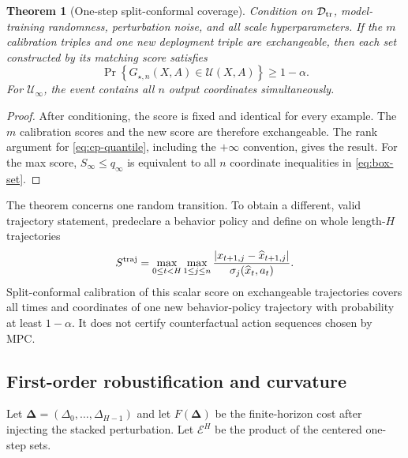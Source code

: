 \documentclass[10pt]{article}
\newtheorem{theorem}{Theorem}
\newcommand{\U}{\mathcal U}
\newcommand{\D}{\mathcal D}
\begin{document}
\begin{theorem}[One-step split-conformal coverage]
Condition on $\D_{\rm tr}$, model-training randomness, perturbation noise, and
all scale hyperparameters. If the $m$ calibration triples and one new
deployment triple are exchangeable, then each set constructed by its matching
score satisfies
\[
\Pr\left\{G_{\star,n}(X,A)\in\U(X,A)\right\}\ge1-\alpha.
\]
For $\U_\infty$, the event contains all $n$ output coordinates
simultaneously.
\end{theorem}
\begin{proof}
After conditioning, the score is fixed and identical for every example. The
$m$ calibration scores and the new score are therefore exchangeable. The rank
argument for \cref{eq:cp-quantile}, including the $+\infty$ convention, gives
the result. For the max score, $S_\infty\le q_\infty$ is equivalent to all
$n$ coordinate inequalities in \cref{eq:box-set}.
\end{proof}

The theorem concerns one random transition. To obtain a different, valid
trajectory statement, predeclare a behavior policy and define on whole
length-$H$ trajectories
\begin{equation}
S^{\rm traj}
=\max_{0\le t<H}\max_{1\le j\le n}
\frac{|x_{t+1,j}-\widehat x_{t+1,j}|}
{\sigma_j(\widehat x_t,a_t)}.
\label{eq:trajectory-score}
\end{equation}
Split-conformal calibration of this scalar score on exchangeable trajectories
covers all times and coordinates of one new behavior-policy trajectory with
probability at least $1-\alpha$. It does not certify counterfactual action
sequences chosen by MPC.

\subsection{First-order robustification and curvature}

Let $\bm\Delta=(\Delta_0,\ldots,\Delta_{H-1})$ and let
$F(\bm\Delta)$ be the finite-horizon cost after injecting the stacked
perturbation. Let $\mathcal E^H$ be the product of the centered one-step sets.
\end{document}
